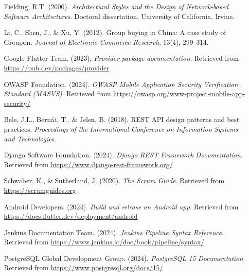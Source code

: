 \documentclass[12pt, a4paper]{report}
\begin{document}
\begin{enumerate}[leftmargin=*, label={[\arabic*]}]
  \item Fielding, R.T. (2000). \textit{Architectural Styles and the Design of Network-based Software Architectures}. Doctoral dissertation, University of California, Irvine.
  \item Li, C., Shen, J., \& Xu, Y. (2012). Group buying in China: A case study of Groupon. \textit{Journal of Electronic Commerce Research}, 13(4), 299--314.
  \item Google Flutter Team. (2023). \textit{Provider package documentation}. Retrieved from \url{https://pub.dev/packages/provider}
  \item OWASP Foundation. (2024). \textit{OWASP Mobile Application Security Verification Standard (MASVS)}. Retrieved from \url{https://owasp.org/www-project-mobile-app-security/}
  \item Bele, J.L., Bern\'{a}t, T., \& Jelen, B. (2018). REST API design patterns and best practices. \textit{Proceedings of the International Conference on Information Systems and Technologies}.
  \item Django Software Foundation. (2024). \textit{Django REST Framework Documentation}. Retrieved from \url{https://www.django-rest-framework.org/}
  \item Schwaber, K., \& Sutherland, J. (2020). \textit{The Scrum Guide}. Retrieved from \url{https://scrumguides.org}
  \item Android Developers. (2024). \textit{Build and release an Android app}. Retrieved from \url{https://docs.flutter.dev/deployment/android}
  \item Jenkins Documentation Team. (2024). \textit{Jenkins Pipeline Syntax Reference}. Retrieved from \url{https://www.jenkins.io/doc/book/pipeline/syntax/}
  \item PostgreSQL Global Development Group. (2024). \textit{PostgreSQL 15 Documentation}. Retrieved from \url{https://www.postgresql.org/docs/15/}
\end{enumerate}
\end{document}
